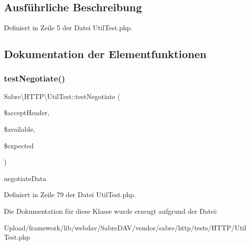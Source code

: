 \subsection{Ausführliche Beschreibung}


Definiert in Zeile 5 der Datei Util\+Test.\+php.



\subsection{Dokumentation der Elementfunktionen}
\mbox{\label{class_sabre_1_1_h_t_t_p_1_1_util_test_a2968b70c61c55577735f270ed0839028}} 
\subsubsection{\texorpdfstring{test\+Negotiate()}{testNegotiate()}}
{\footnotesize\ttfamily Sabre\textbackslash{}\+H\+T\+T\+P\textbackslash{}\+Util\+Test\+::test\+Negotiate (\begin{DoxyParamCaption}\item[{}]{\$accept\+Header,  }\item[{}]{\$available,  }\item[{}]{\$expected }\end{DoxyParamCaption})}

negotiate\+Data 

Definiert in Zeile 79 der Datei Util\+Test.\+php.



Die Dokumentation für diese Klasse wurde erzeugt aufgrund der Datei\+:\begin{DoxyCompactItemize}
\item 
Upload/framework/lib/webdav/\+Sabre\+D\+A\+V/vendor/sabre/http/tests/\+H\+T\+T\+P/Util\+Test.\+php\end{DoxyCompactItemize}

